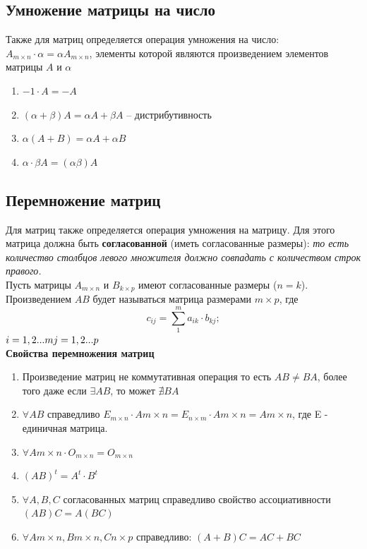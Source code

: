 \documentclass[oneside]{book}
\begin{document}
\begin{enumerate}
\begin{itemize}
\begin{enumerate}
\subsection{Умножение матрицы на число}
Также для матриц определяется операция умножения на число:\\
$A_{m\times n}\cdot \alpha=\alpha A_{m\times n}$, элементы которой являются произведением элементов матрицы $A$ и $\alpha$
\begin{enumerate}
\item $-1\cdot A=-A$
\item $(\alpha + \beta)A=\alpha A + \beta A$ -- дистрибутивность
\item $\alpha (A+B)= \alpha A + \alpha B$
\item $\alpha \cdot \beta A = (\alpha \beta) A$
\end{enumerate}
\subsection{Перемножение матриц}
Для матриц также определяется операция умножения на матрицу. Для этого матрица должна быть \textbf{согласованной} (иметь согласованные размеры): \textit{то есть количество столбцов левого множителя должно совпадать с количеством строк правого.}\\
Пусть матрицы 	$A_{m\times n}$	и $B_{k\times p}$ имеют согласованные размеры ($n=k$). Произведением $AB$ будет называться матрица размерами $m\times p$, где 
$$c_{i j}=\sum_{1}^{m} a_{i k}\cdot b_{k j};$$ $i= 1, 2... m\\ j= 1, 2... p$\\
\textbf{Свойства перемножения матриц}
\begin{enumerate}
\item  Произведение матриц не коммутативная операция то есть $AB\ne BA$, более того даже если $\exists AB$, то может $\nexists BA$	
\item $\forall AB$ справедливо $E_{m\times n}\cdot A{m\times n}=E_{n\times m}\cdot A{m\times n}=A{m\times n}$, где E - единичная матрица.
\item $\forall A{m\times n}\cdot O_{m\times n} = O_{m\times n} $
\item $(AB)^{t}=A^{t}\cdot B^{t}$
\item $\forall A, B, C$ согласованных матриц справедливо свойство ассоциативности $(AB)C=A(BC)$ 
\item $\forall A{m\times n}, B{m\times n}, C{n\times p}$ справедливо: $(A+B)C=AC+BC$
\end{enumerate}


\end{enumerate}
\end{itemize}
\end{enumerate}
\end{document}
